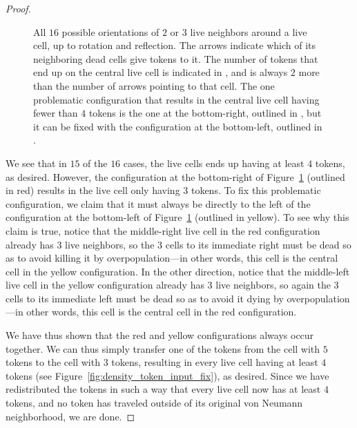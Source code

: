 \begin{proof}
\begin{figure}[!htb]
		\caption{All $16$ possible orientations of $2$ or $3$ live neighbors around a live cell, up to rotation and reflection. The  arrows indicate which of its neighboring dead cells give tokens to it. The number of tokens that end up on the central live cell is indicated in , and is always $2$ more than the number of arrows pointing to that cell. The one problematic configuration that results in the central live cell having fewer than $4$ tokens is the one at the bottom-right, outlined in , but it can be fixed with the configuration at the bottom-left, outlined in .}\label{fig:density_token_input}
	\end{figure}
	
	We see that in $15$ of the $16$ cases, the live cells ends up having at least $4$ tokens, as desired. However, the configuration at the bottom-right of Figure~\ref{fig:density_token_input} (outlined in red) results in the live cell only having $3$ tokens. To fix this problematic configuration, we claim that it must always be directly to the left of the configuration at the bottom-left of Figure~\ref{fig:density_token_input} (outlined in yellow). To see why this claim is true, notice that the middle-right live cell in the red configuration already has $3$ live neighbors, so the $3$ cells to its immediate right must be dead so as to avoid killing it by overpopulation---in other words, this cell is the central cell in the yellow configuration. In the other direction, notice that the middle-left live cell in the yellow configuration already has $3$ live neighbors, so again the $3$ cells to its immediate left must be dead so as to avoid it dying by overpopulation---in other words, this cell is the central cell in the red configuration.
	
	We have thus shown that the red and yellow configurations always occur together. We can thus simply transfer one of the tokens from the cell with $5$ tokens to the cell with $3$ tokens, resulting in every live cell having at least $4$ tokens (see Figure~\ref{fig:density_token_input_fix}), as desired. Since we have redistributed the tokens in such a way that every live cell now has at least $4$ tokens, and no token has traveled outside of its original von Neumann neighborhood, we are done.
\end{proof}

